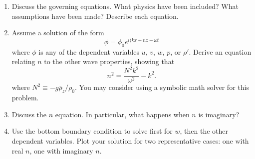 \documentclass[11pt]{report}
\numberwithin{equation}{section}
\begin{document}
\begin{enumerate}
\item Discuss the governing equations.  What physics have been included?
What assumptions have been made?   Describe each equation.
\item Assume a solution of the form \[\phi = \phi_0 e^{i(k x + n z -\omega
t}\] where $\phi$ is any of the dependent variables $u$, $v$, $w$, $p$, or
$\rho'$.  Derive an equation relating $n$ to the other wave properties,
showing that
\begin{equation}
n^2 = \frac{N^2 k^2}{\omega^2} - k^2.
\end{equation}
where $N^2 \equiv -g \bar{\rho}_z / \rho_0$.  You may consider using a
symbolic math solver for this problem.
\item Discuss the $n$ equation.  In particular, what happens when $n$ is
imaginary?  
\item Use the bottom boundary condition to solve first for $w$, then the
other dependent variables.  Plot your solution for two representative
cases: one with real $n$, one with imaginary $n$.
\end{enumerate}




\clearpage 




\clearpage

\printindex
\end{document}
